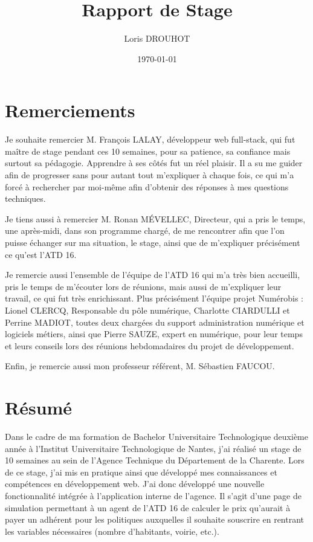 \documentclass[a4paper,12pt]{report}
\title{Rapport de Stage}
\author{Loris DROUHOT}
\date{\today}
\begin{document}
\maketitle
\newpage
\thispagestyle{empty}

\chapter*{Remerciements}

Je souhaite remercier M. François LALAY, développeur web full-stack, qui fut maître de stage pendant ces 10 semaines, pour sa patience, sa confiance mais surtout sa pédagogie. Apprendre à ses côtés fut un réel plaisir. Il a su me guider afin de progresser sans pour autant tout m'expliquer à chaque fois, ce qui m’a forcé à rechercher par moi-même afin d’obtenir des réponses à mes questions techniques.

\vspace{1em}

Je tiens aussi à remercier M. Ronan MÉVELLEC, Directeur, qui a pris le temps, une après-midi, dans son programme chargé, de me rencontrer afin que l’on puisse échanger sur ma situation, le stage, ainsi que de m’expliquer précisément ce qu'est l’ATD 16.

\vspace{1em}

Je remercie aussi l’ensemble de l’équipe de l’ATD 16 qui m’a très bien accueilli, pris le temps de m’écouter lors de réunions, mais aussi de m’expliquer leur travail, ce qui fut très enrichissant. Plus précisément l'équipe projet Numérobis : Lionel CLERCQ, Responsable du pôle numérique, Charlotte CIARDULLI et Perrine MADIOT, toutes deux chargées du support administration numérique et logiciels métiers, ainsi que Pierre SAUZE, expert en numérique, pour leur temps et leurs conseils lors des réunions hebdomadaires du projet de développement.

\vspace{1em}

Enfin, je remercie aussi mon professeur référent, M. Sébastien FAUCOU.

\newpage
\chapter*{Résumé}
\thispagestyle{empty}

Dans le cadre de ma formation de Bachelor Universitaire Technologique deuxième année à l’Institut Universitaire Technologique de Nantes, j’ai réalisé un stage de 10 semaines au sein de l’Agence Technique du Département de la Charente. Lors de ce stage, j’ai mis en pratique ainsi que développé mes connaissances et compétences en développement web. J’ai donc développé une nouvelle fonctionnalité intégrée à l'application interne de l’agence. Il s'agit d'une page de simulation permettant à un agent de l'ATD 16 de calculer le prix qu’aurait à payer un adhérent pour les politiques auxquelles il souhaite souscrire en rentrant les variables nécessaires (nombre d’habitants, voirie, etc.).
\end{document}
